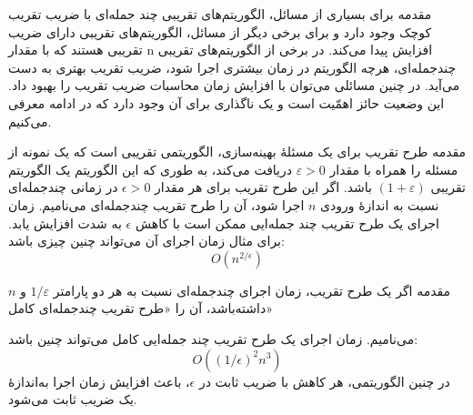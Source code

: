 \begin{itemframe}{مقدمه}
\itm
برای بسیاری از مسائل، الگوریتم‌های تقریبی چند جمله‌ای با ضریب تقریب کوچک وجود دارد و برای برخی دیگر از مسائل، الگوریتم‌های تقریبی دارای ضریب تقریبی هستند که با مقدار n افزایش پیدا می‌کند.
\itm
در برخی از الگوریتم‌های تقریبی چندجمله‌ای، هرچه الگوریتم در زمان بیشتری اجرا شود، ضریب تقریب بهتری به دست می‌آید. در چنین مسائلی می‌توان با افزایش زمان محاسبات ضریب تقریب را بهبود داد.
\itm
این وضعیت حائز اهمّیت است و یک ناگذاری برای آن وجود دارد که در ادامه معرفی می‌کنیم.
\end{itemframe}

\begin{itemframe}{مقدمه}
\itm
طرح تقریب
برای یک مسئلهٔ بهینه‌سازی، الگوریتمی تقریبی است که یک نمونه از مسئله را همراه با مقدار
$\varepsilon > 0$
دریافت می‌کند، به طوری که این الگوریتم یک الگوریتم تقریبی
$(1 + \varepsilon)$
 باشد.
\itm
اگر این طرح تقریب برای هر مقدار
$\epsilon > 0$
در زمانی چندجمله‌ای نسبت به اندازهٔ ورودی $n$ اجرا شود، آن را طرح تقریب چندجمله‌ای
 می‌نامیم.
\itm
زمان اجرای یک طرح تقریب چند جمله‌ایی ممکن است با کاهش
$\epsilon$
 به شدت افزایش یابد. برای مثال زمان اجرای آن می‌تواند چنین چیزی باشد:
$$
O(n^{2/\epsilon})
$$
\end{itemframe}


\begin{itemframe}{مقدمه}
\itm
اگر یک طرح تقریب، زمان اجرای چندجمله‌ای نسبت به هر دو پارامتر
$1/\varepsilon$
و $n$ داشته‌باشد، آن را «طرح تقریب چندجمله‌ای کامل»

می‌نامیم. زمان اجرای یک طرح تقریب چند جمله‌ایی کامل می‌تواند چنین باشد:
$$
O((1/\epsilon)^2n^3)
$$
\itm
در چنین الگوریتمی، هر کاهش با ضریب ثابت در $\epsilon$، باعث افزایش زمان اجرا به‌اندازهٔ یک ضریب ثابت می‌شود.
\end{itemframe}
